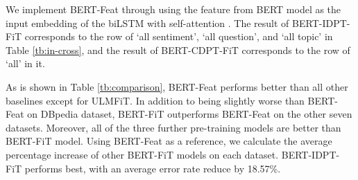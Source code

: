 \documentclass[11pt,a4paper]{article}
\theoremstyle{definition}
\begin{document}
\begin{CJK*}{UTF8}{gbsn}
	We implement BERT-Feat through using the feature from BERT model as the input embedding of the biLSTM with self-attention \cite{lin2017structured}. The result of BERT-IDPT-FiT corresponds to the row of `all sentiment', `all question', and `all topic' in Table \ref{tb:in-cross}, and the result of BERT-CDPT-FiT corresponds to the row of `all' in it.
	
	As is shown in Table \ref{tb:comparison}, BERT-Feat performs better than all other baselines except for ULMFiT. In addition to being slightly worse than BERT-Feat on DBpedia dataset, BERT-FiT outperforms BERT-Feat on the other seven datasets.
	Moreover, all of the three further pre-training models are better than BERT-FiT model. Using BERT-Feat as a reference, we calculate the average percentage increase of other BERT-FiT models on each dataset. BERT-IDPT-FiT performs best, with an average error rate reduce by 18.57\%.

	


\end{CJK*}
\end{document}
